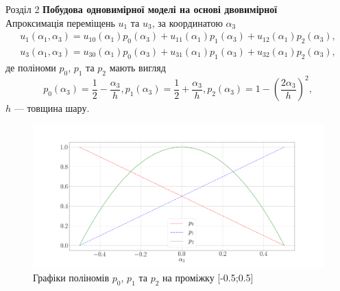 \documentclass[8pt]{beamer}
\numberwithin{figure}{section}
\numberwithin{equation}{section}
\numberwithin{table}{section}
\begin{document}
\begin{frame}{Розділ 2}
\textbf{Побудова одновимірної моделі на основі двовимірної}
\\
\vspace{1em}
Апроксимація переміщень $u_1$ та $u_3$, за координатою $\alpha_3$ 
\begin{align}
u_1 \left( \alpha_1, \alpha_3 \right) = u_{10} \left( \alpha_1\right)p_0 \left( \alpha_3\right)+u_{11} \left( \alpha_1\right)p_1 \left( \alpha_3\right)+u_{12} \left( \alpha_1\right)p_2 \left( \alpha_3\right),\\
u_3 \left( \alpha_1, \alpha_3 \right) = u_{30} \left( \alpha_1\right)p_0 \left( \alpha_3\right)+u_{31} \left( \alpha_1\right)p_1 \left( \alpha_3\right)+u_{32} \left( \alpha_1\right)p_2 \left( \alpha_3\right),
\end{align}
де поліноми $p_0$, $p_1$ та $p_2$ мають вигляд
\begin{equation}
p_0 \left( \alpha_3\right) = \frac12-\frac{\alpha_3}{h},
p_1 \left( \alpha_3\right) = \frac12+\frac{\alpha_3}{h},
p_2 \left( \alpha_3\right) = 1-\left(\frac{2\alpha_3}{h}\right)^2,
\end{equation}
$h$ --- товщина шару.
\begin{figure}
\includegraphics[scale=0.1]{pic/polin.png}
\caption{Графіки поліномів $p_0$, $p_1$ та $p_2$ на проміжку [-0.5;0.5]}
\end{figure}

\end{frame}
\end{document}
